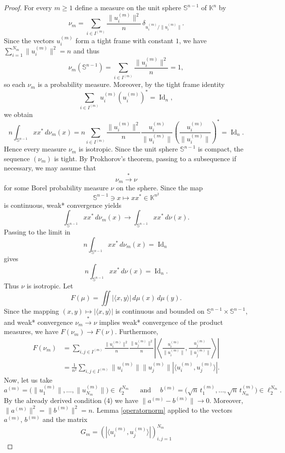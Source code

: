 \documentclass[12pt, reqno]{amsart}
\theoremstyle{definition}
\theoremstyle{remark}
\numberwithin{equation}{section}
\DeclareMathOperator{\id}{Id}
\begin{document}
\begin{proof}
For every $m\geq 1$ define a measure on the unit sphere $\mathbb{S}^{n-1}$ of $\mathbb K^n$ by 
$$ \nu_m = \sum_{i\in I^{(m)}} \frac{\|u_i^{(m)}\|^2}{n}\, \delta_{u_i^{(m)}/\|u_i^{(m)}\|}.$$ 
Since the vectors $u_i^{(m)}$ form a tight frame with constant $1$, we have $ \sum_{i=1}^{N_m}\|u_i^{(m)}\|^2=n$ and thus 
$$ \nu_m(\mathbb{S}^{n-1}) = \sum_{i\in I^{(m)}}\frac{\|u_i^{(m)}\|^2}{n} = 1, $$
so each $\nu_m$ is a probability measure. Moreover, by the tight frame identity 
$$ \sum_{i\in I^{(m)}}u_i^{(m)}(u_i^{(m)})^*=\id_n, $$ 
we obtain 
$$ n\int_{\mathbb{S}^{n-1}}xx^*\,d\nu_m(x) = n\sum_{i\in I^{(m)}} \frac{\|u_i^{(m)}\|^2}{n} \frac{u_i^{(m)}}{\|u_i^{(m)}\|} \left( \frac{u_i^{(m)}}{\|u_i^{(m)}\|} \right)^* = \id_n. $$ Hence every measure $\nu_m$ is isotropic. Since the unit sphere $\mathbb{S}^{n-1}$ is compact, the sequence $(\nu_m)$ is tight. By Prokhorov's theorem, passing to a subsequence if necessary, we may assume that 
$$ \nu_m \stackrel{*}{\to} \nu $$ 
for some Borel probability measure $\nu$ on the sphere. Since the map 
$$ \mathbb{S}^{n-1}\ni x\mapsto xx^*\in \mathbb{K}^{n^2} $$ 
is continuous, weak* convergence yields 
$$ \int_{\mathbb{S}^{n-1}}xx^*\,d\nu_m(x) \to \int_{\mathbb{S}^{n-1}}xx^*\,d\nu(x). $$ 
Passing to the limit in 
$$ n\int_{\mathbb{S}^{n-1}}xx^*\,d\nu_m(x)=\id_n $$ 
gives $$ n\int_{\mathbb{S}^{n-1}}xx^*\,d\nu(x)=\id_n. $$ 
Thus $\nu$ is isotropic. Let 
$$ F(\mu) = \iint |\langle x,y\rangle| \,d\mu(x)\,d\mu(y). $$ 
Since the mapping $(x,y)\mapsto |\langle x,y\rangle|$ is continuous and bounded on $\mathbb{S}^{n-1} \times \mathbb{S}^{n-1}$, and weak* convergence $ \nu_m \stackrel{*}{\to} \nu $ implies weak* convergence of the product measures, we have $F(\nu_m)\to F(\nu)$. Furthermore, 
\begin{align*} F(\nu_m) &= \sum_{i,j\in I^{(m)}} \frac{\|u_i^{(m)}\|^2}{n} \frac{\|u_j^{(m)}\|^2}{n} \left| \left\langle \frac{u_i^{(m)}}{\|u_i^{(m)}\|}, \frac{u_j^{(m)}}{\|u_j^{(m)}\|} \right\rangle \right|\\ &= \frac1{n^2} \sum_{i,j\in I^{(m)}} \|u_i^{(m)}\| \|u_j^{(m)}\| |\langle u_i^{(m)},u_j^{(m)}\rangle|. \end{align*} 
Now, let us take 
$$ a^{(m)} = \bigl(\|u_1^{(m)}\|,\ldots,\|u_{N_m}^{(m)}\|\bigr) \in \ell_2^{N_m} \quad \text{ and } \quad b^{(m)} = \bigl(\sqrt n\,t_1^{(m)},\ldots,\sqrt n\,t_{N_m}^{(m)}\bigr) \in \ell_2^{N_m}. $$ 
By the already derived condition (4) we have $ \|a^{(m)}-b^{(m)}\| \to 0. $
Moreover, $ \|a^{(m)}\|^2 = \|b^{(m)}\|^2 = n$. Lemma \ref{operatornorm} applied to the vectors $a^{(m)}$, $b^{(m)}$ and the matrix $$ G_m= \left (|\langle u_i^{(m)},u_j^{(m)}\rangle| \right )_{i,j=1}^{N_m}$$

\end{proof}
\end{document}
